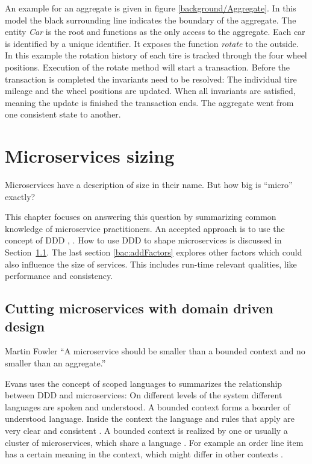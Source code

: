 An example for an aggregate is given in figure \ref{background/Aggregate}.
In this model the black surrounding line indicates the boundary of the aggregate. 
The entity \textit{Car} is the root and functions as the only access to the aggregate.
Each car is identified by a unique identifier.
It exposes the function \textit{rotate} to the outside.
In this example the rotation history of each tire is tracked through the four wheel positions.
Execution of the rotate method will start a transaction.
Before the transaction is completed the invariants need to be resolved:
The individual tire mileage and the wheel positions are updated.
When all invariants are satisfied, meaning the update is finished the transaction ends.
The aggregate went from one consistent state to another.
\citep[p. 127]{Evans2004}


\section{Microservices sizing}
\label{bac:mssizing}
Microservices have a description of size in their name.
But how big is ``micro'' exactly?

This chapter focuses on answering this question by summarizing common knowledge of microservice practitioners.
An accepted approach is to use the concept of \ac{DDD} \citep[p. 34]{Newman2015}, \citep[p. 44]{Wolff2016}.
How to use \ac{DDD} to shape microservices is discussed in Section~\ref{bac:cuttingMSDDD}.
The last section \ref{bac:addFactors} explores other factors which could also influence the size of services.
This includes run-time relevant qualities, like performance and consistency.

\subsection{Cutting microservices with domain driven design}
\label{bac:cuttingMSDDD}
\begin{chapquote}{Martin Fowler}
``A microservice should be smaller than a bounded context and no smaller than an aggregate.'' 
\end{chapquote}

Evans uses the concept of scoped languages to summarizes the relationship between \ac{DDD} and microservices:
On different levels of the system different languages are spoken and understood.
A bounded context forms a boarder of understood language.
Inside the context the language and rules that apply are very clear and consistent \cite[24:10]{RadioDDD2015}.
A bounded context is realized by one or usually a cluster of microservices, which share a language \citep[27:00]{RadioDDD2015}.
For example an order line item has a certain meaning in the context, which might differ in other contexts \citep[23:50]{RadioDDD2015}.

